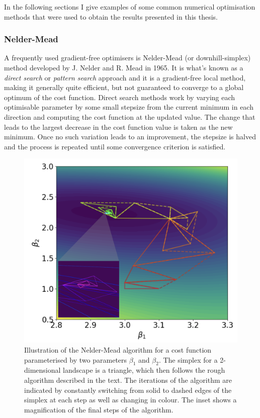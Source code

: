 In the following sections I give examples of some common numerical optimisation methods that were used to obtain the results presented in this thesis.

\subsubsection{Nelder-Mead}\label{sec:3.1.3.1_Nelder_Mead}

A frequently used gradient-free optimisers is Nelder-Mead (or downhill-simplex) method \cite{nelder_simplex_1965} developed by J. Nelder and R. Mead in 1965. It is what's known as a \emph{direct search} or \emph{pattern search} approach and it is a gradient-free local method, making it generally quite efficient, but not guaranteed to converge to a global optimum of the cost function. Direct search methods work by varying each optimisable parameter by some small stepsize from the current minimum in each direction and computing the cost function at the updated value. The change that leads to the largest decrease in the cost function value is taken as the new minimum. Once no such variation leads to an improvement, the stepsize is halved and the process is repeated until some convergence criterion is satisfied.

\begin{figure}[t]
\centering
\includegraphics[width=0.6\linewidth]{images/nelder_mead_illustration.png} \caption[Visualising the Nelder-Mead optimisation algorithm.]{Illustration of the Nelder-Mead algorithm for a cost function parameterised by two parameters $\beta_1$ and $\beta_2$. The simplex for a 2-dimensional landscape is a triangle, which then follows the rough algorithm described in the text. The iterations of the algorithm are indicated by constantly switching from solid to dashed edges of the simplex at each step as well as changing in colour. The inset shows a magnification of the final steps of the algorithm.}\label{fig:nelder_mead}
\end{figure}

